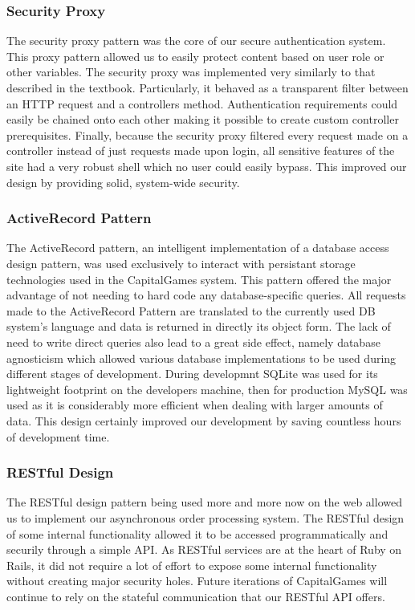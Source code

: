 \subsubsection{Security Proxy}
The security proxy pattern was the core of our secure authentication system. This proxy pattern allowed us to easily protect content based on user role or other variables. The security proxy was implemented very similarly to that described in the textbook. Particularly, it behaved as a transparent filter between an HTTP request and a controllers method. Authentication requirements could easily be chained onto each other making it possible to create custom controller prerequisites. Finally, because the security proxy filtered every request made on a controller instead of just requests made upon login, all sensitive features of the site had a very robust shell which no user could easily bypass. This improved our design by providing solid, system-wide security.
\subsubsection{ActiveRecord Pattern}
The ActiveRecord pattern, an intelligent implementation of a database access design pattern, was used exclusively to interact with persistant storage technologies used in the CapitalGames system. This pattern offered the major advantage of not needing to hard code any database-specific queries. All requests made to the ActiveRecord Pattern are translated to the currently used DB system's language and data is returned in directly its object form. The lack of need to write direct queries also lead to a great side effect, namely database agnosticism which allowed various database implementations to be used during different stages of development. During developmnt SQLite was used for its lightweight footprint on the developers machine, then for production MySQL was used as it is considerably more efficient when dealing with larger amounts of data. This design certainly improved our development by saving countless hours of development time.
\subsubsection{RESTful Design}
The RESTful design pattern being used more and more now on the web allowed us to implement our asynchronous order processing system. The RESTful design of some internal functionality allowed it to be accessed programmatically and securily through a simple API. As RESTful services are at the heart of Ruby on Rails, it did not require a lot of effort to expose some internal functionality without creating major security holes. Future iterations of CapitalGames will continue to rely on the stateful communication that our RESTful API offers.
